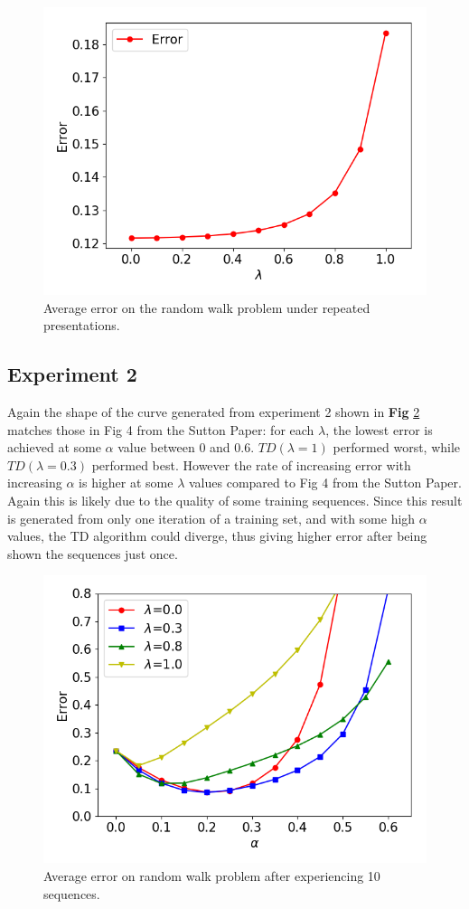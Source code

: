 \documentclass[10pt]{article}
\begin{document}
\begin{figure}[H]
  \centering
  \includegraphics[width=0.6\linewidth]{../results/experiment1.png}
      \caption{Average error on the random walk problem under repeated presentations.}
  \label{fig:fig3}
\end{figure}




\subsection{Experiment 2} \label{results2}
Again the shape of the curve generated from experiment 2 shown in \textbf{Fig} \ref{fig:fig4} matches those in Fig 4 from the Sutton Paper: for each $\lambda$, the lowest error is achieved at some $\alpha$ value between 0 and 0.6. $TD(\lambda=1)$ performed worst, while $TD(\lambda=0.3)$ performed best. However the rate of increasing error with increasing $\alpha$ is higher at some $\lambda$ values compared to Fig 4 from the Sutton Paper. Again this is likely due to the quality of some training sequences. Since this result is generated from only one iteration of a training set, and with some high $\alpha$ values, the TD algorithm could diverge, thus giving higher error after being shown the sequences just once.

\begin{figure}[H]
  \centering
  \includegraphics[width=0.6\linewidth]{../results/experiment2.png}
     \caption{Average error on random walk problem after experiencing 10 sequences.}
  \label{fig:fig4}
\end{figure}
\end{document}
